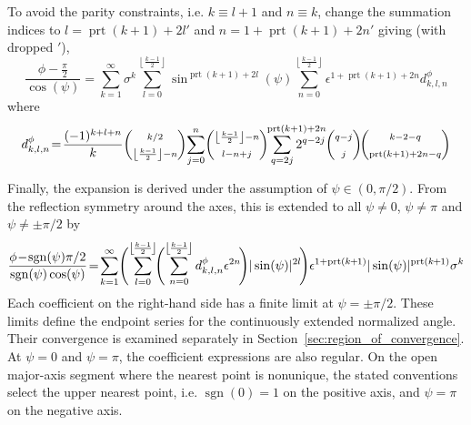 \documentclass[a4paper]{amsart}
\DeclareMathOperator{\sgn}{sgn}
\DeclareMathOperator{\prt}{prt}
\begin{document}
To avoid the parity constraints, i.e. $k\equiv l+1$ and $n\equiv k$, change the summation indices to $l=\prt(k+1)+2l'$ and $n=1+\prt(k+1)+2n'$
giving (with dropped ${}'$),
\begin{equation*}
\frac{\phi-\tfrac{\pi}{2}}{\cos(\psi)}
=
\sum_{k=1}^{\infty}
\sigma^k
\sum_{l=0}^{\left\lfloor\frac{k-1}{2}\right\rfloor}
\sin^{\prt(k+1)+2l}(\psi)
\sum_{n=0}^{\left\lfloor\frac{k-1}{2}\right\rfloor}
\epsilon^{1+\prt(k+1)+2n}
d^\phi_{k,l,n}
\end{equation*}
where
\begin{equation}\label{eq:d_phi}
d^\phi_{k,l,n}
\!=\!
\frac{(-1)^{k+l+n}}{k}
\binom{\scriptstyle k/2}{\scriptstyle \left\lfloor\frac{k-1}{2}\right\rfloor-n}
\!\sum_{j=0}^{n}\!
\binom{\scriptstyle \left\lfloor\frac{k-1}{2}\right\rfloor-n}{\scriptstyle l-n+j}
\hspace{-9mm}
\sum_{q=2j}^{\hspace{8mm}\prt(k+1)+2n}
\hspace{-9mm}2^{q-2j}
\binom{\scriptstyle q-j}{\scriptstyle j}\!
\binom{\scriptstyle k-2-q}{\scriptstyle \prt(k+1)+2n-q}
\end{equation}

Finally, the expansion is derived under the assumption of $\psi\in(0,\pi/2)$. From the reflection symmetry around the axes, this is extended to all $\psi\neq 0$, $\psi\neq \pi$ and $\psi\neq\pm\pi/2$ by
\begin{equation}\label{eq:phi_dense_expansion}
\frac{\phi\!-\!\sgn(\psi)\pi/2}{\sgn(\psi)\cos(\psi)}
\!=\!
\sum_{k=1}^{\infty}\!\Bigg(\!
\sum_{l=0}^{\left\lfloor\mkern-2mu\frac{k-1}{2}\mkern-2mu\right\rfloor}\!\!\Bigg(\!
\sum_{n=0}^{\left\lfloor\mkern-2mu\frac{k-1}{2}\mkern-2mu\right\rfloor}
d^\phi_{k,l,n}
\epsilon^{2n}
\!\Bigg)|\sin(\psi)|^{2l}
\!\Bigg)\epsilon^{1+\prt(k\mkern-1mu+\mkern-1mu1)}|\sin(\psi)|^{\prt(k\mkern-1mu+\mkern-1mu1)}\sigma^k
\end{equation}
%
Each coefficient on the right-hand side has a finite limit at $\psi=\pm\pi/2$. These limits define the endpoint series for the continuously extended normalized angle. Their convergence is examined separately in Section~\ref{sec:region_of_convergence}.
%
At $\psi=0$ and $\psi=\pi$, the coefficient expressions are also regular. On the open major-axis segment where the nearest point is nonunique, the stated conventions select the upper nearest point, i.e. $\sgn(0)=1$ on the positive axis, and $\psi=\pi$ on the negative axis.
\end{document}
